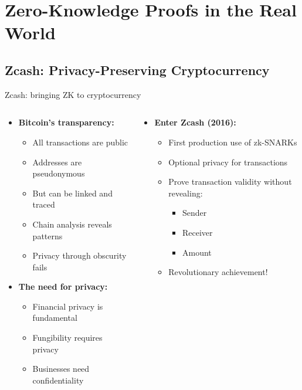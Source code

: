 \documentclass[aspectratio=169, lualatex, handout]{beamer}
\begin{document}
\section{Zero-Knowledge Proofs in the Real World}

\subsection{Zcash: Privacy-Preserving Cryptocurrency}

\begin{frame}{Zcash: bringing ZK to cryptocurrency}
	\begin{columns}[c]
		\begin{column}{0.5\textwidth}
			\begin{itemize}
				\item \textbf{Bitcoin's transparency:}
				      \begin{itemize}
					      \item All transactions are public
					      \item Addresses are pseudonymous
					      \item But can be linked and traced
					      \item Chain analysis reveals patterns
					      \item Privacy through obscurity fails
				      \end{itemize}
				\item \textbf{The need for privacy:}
				      \begin{itemize}
					      \item Financial privacy is fundamental
					      \item Fungibility requires privacy
					      \item Businesses need confidentiality
				      \end{itemize}
			\end{itemize}
		\end{column}
		\begin{column}{0.5\textwidth}
			\begin{itemize}
				\item \textbf{Enter Zcash (2016):}
				      \begin{itemize}
					      \item First production use of zk-SNARKs
					      \item Optional privacy for transactions
					      \item Prove transaction validity without revealing:
					            \begin{itemize}
						            \item Sender
						            \item Receiver
						            \item Amount
					            \end{itemize}
					      \item Revolutionary achievement!
				      \end{itemize}
			\end{itemize}
		\end{column}
	\end{columns}
\end{frame}
\end{document}
